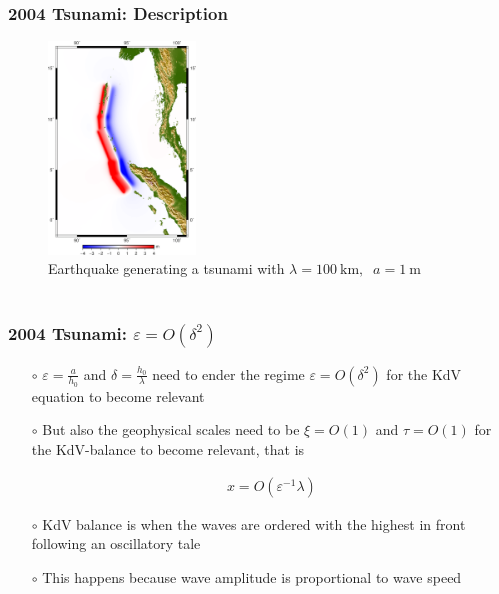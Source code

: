\documentclass[fleqn]{beamer}
\begin{document}
    \begin{frame}
        \frametitle{2004 Tsunami: Description}

        \begin{figure}[htpb]
            \centering
            \includegraphics[width=0.35\textwidth]{./pics/water-surface.png}
            \caption{Earthquake generating a tsunami with $\lambda = 100\
            \text{km},\;\; a = 1\ \text{m}$}
        \end{figure}
        \begin{ceqn}
        \begin{align}
        \end{align}
        \end{ceqn}

    \end{frame}

    \begin{frame}
        \frametitle{2004 Tsunami: $\varepsilon=O\left(\delta^2\right)$}

        \begin{itemize}
            \item[$\circ$] $\varepsilon = \frac{a}{h_0}$ and $\delta =
                \frac{h_0}{\lambda}$ need to ender the regime
                $\varepsilon=O(\delta^2)$ for the KdV equation to become
                relevant
            \item[$\circ$] But also the geophysical scales need to be $\xi = O(1)$ and $\tau =
                O(1)$ for the KdV-balance to become relevant, that is
                \begin{ceqn}
                \begin{align}
                    x = O\left(\varepsilon^{-1} \lambda \right)
                \end{align}
                \end{ceqn}
            \item[$\circ$] KdV balance is when the waves are ordered with the
                highest in front following an oscillatory tale
            \item[$\circ$] This happens because wave amplitude is proportional to
                wave speed
        \end{itemize}

    \end{frame}
\end{document}
